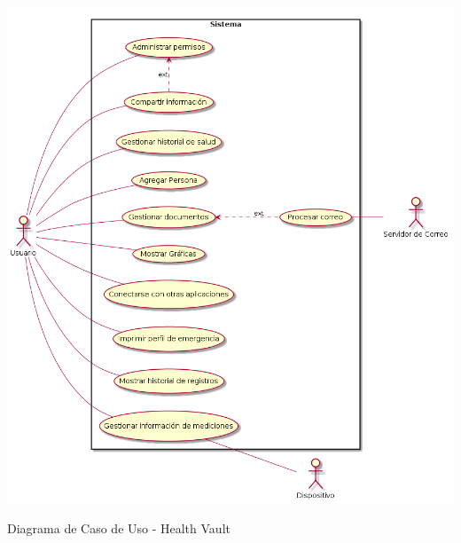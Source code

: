 \begin{correccionFigure} 
  \centering
\includegraphics[width=1\textwidth]{img/tp1/cu-hv}
  \caption{Diagrama de Caso de Uso - Health Vault}
  \label{casoDeUsoHV}
\end{correccionFigure} 
